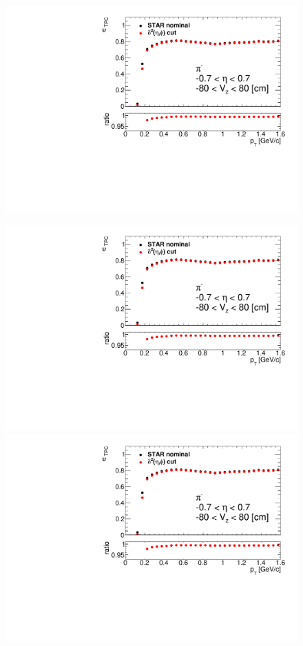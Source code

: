 \begin{figure}[ht]
{		\includegraphics[width=\linewidth,page=5]{graphics/eff/tpcEffi.pdf}\\
	}%
	\parbox{0.329\textwidth}{
		\centering
		\includegraphics[width=\linewidth,page=3]{graphics/eff/tpcEffi.pdf}\\
		\includegraphics[width=\linewidth,page=6]{graphics/eff/tpcEffi.pdf}\\
}
\end{figure}
